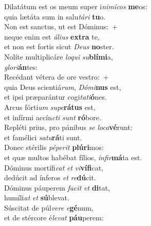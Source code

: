 \evenverse Dilatátum est os meum super i\textit{ni}\textit{mí}\textit{cos} \textbf{me}os:~\*\\
\evenverse quia lætáta sum in salu\textit{tá}\textit{ri} \textbf{tu}o.\\
\oddverse Non est sanctus, ut est Dóminus:~+\\
\oddverse  neque enim est \textit{á}\textit{li}\textit{us} \textbf{ex}\textbf{tra} te,~\*\\
\oddverse et non est fortis sicut \textit{De}\textit{us} \textbf{no}ster.\\
\evenverse Nolíte multiplicáre \textit{lo}\textit{qui} \textit{su}\textbf{blí}\textbf{mi}a,~\*\\
\evenverse \textit{glo}\textit{ri}\textbf{án}tes:\\
\oddverse Recédant vétera de ore vestro:~+\\
\oddverse  quia Deus scientiá\textit{rum}, \textit{Dó}\textit{mi}\textbf{nus} est,~\*\\
\oddverse et ipsi præparántur cogi\textit{ta}\textit{ti}\textbf{ó}nes.\\
\evenverse Arcus fórti\textit{um} \textit{su}\textit{pe}\textbf{rá}\textbf{tus} est,~\*\\
\evenverse et infírmi accín\textit{cti} \textit{sunt} \textbf{ró}bore.\\
\oddverse Repléti prius, pro pánibus \textit{se} \textit{lo}\textit{ca}\textbf{vé}runt:~\*\\
\oddverse et famélici \textit{sa}\textit{tu}\textbf{rá}ti sunt.\\
\evenverse Donec stérilis \textit{pé}\textit{pe}\textit{rit} \textbf{plú}\textbf{ri}mos:~\*\\
\evenverse et quæ multos habébat fílios, \textit{in}\textit{fir}\textbf{má}ta est.\\
\oddverse Dóminus mortífi\textit{cat} \textit{et} \textit{vi}\textbf{ví}\textbf{fi}cat,~\*\\
\oddverse dedúcit ad ínferos \textit{et} \textit{re}\textbf{dú}cit.\\
\evenverse Dóminus páuperem \textit{fa}\textit{cit} \textit{et} \textbf{di}tat,~\*\\
\evenverse humíli\textit{at} \textit{et} \textbf{sú}blevat.\\
\oddverse Súscitat de púl\textit{ve}\textit{re} \textit{e}\textbf{gé}num,~\*\\
\oddverse et de stércore é\textit{le}\textit{vat} \textbf{páu}perem:\\
